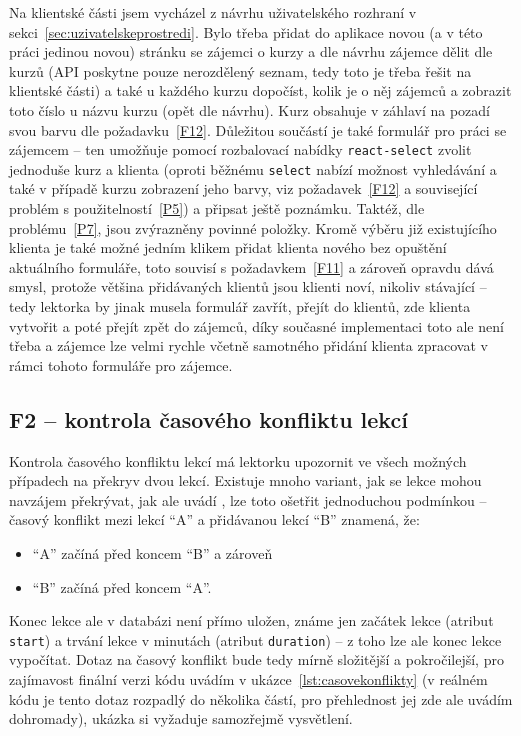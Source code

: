 Na klientské části jsem vycházel z návrhu uživatelského rozhraní v sekci~\ref{sec:uzivatelskeprostredi}. Bylo třeba přidat do aplikace novou (a v této práci jedinou novou) stránku se zájemci o kurzy a dle návrhu zájemce dělit dle kurzů (API poskytne pouze nerozdělený seznam, tedy toto je třeba řešit na klientské části) a také u každého kurzu dopočíst, kolik je o něj zájemců a zobrazit toto číslo u názvu kurzu (opět dle návrhu). Kurz obsahuje v záhlaví na pozadí svou barvu dle požadavku~\ref{F12}. Důležitou součástí je také formulář pro práci se zájemcem -- ten umožňuje pomocí rozbalovací nabídky \verb|react-select| zvolit jednoduše kurz a klienta (oproti běžnému \verb|select| nabízí možnost vyhledávání a také v případě kurzu zobrazení jeho barvy, viz požadavek~\ref{F12} a související problém s použitelností~\ref{P5}) a připsat ještě poznámku. Taktéž, dle problému~\ref{P7}, jsou zvýrazněny povinné položky. Kromě výběru již existujícího klienta je také možné jedním klikem přidat klienta nového bez opuštění aktuálního formuláře, toto souvisí s požadavkem~\ref{F11} a zároveň opravdu dává smysl, protože většina přidávaných klientů jsou klienti noví, nikoliv stávající -- tedy lektorka by jinak musela formulář zavřít, přejít do klientů, zde klienta vytvořit a poté přejít zpět do zájemců, díky současné implementaci toto ale není třeba a zájemce lze velmi rychle včetně samotného přidání klienta zpracovat v rámci tohoto formuláře pro zájemce.

\subsection{F2 -- kontrola časového konfliktu lekcí}

Kontrola časového konfliktu lekcí má lektorku upozornit ve všech možných případech na překryv dvou lekcí. Existuje mnoho variant, jak se lekce mohou navzájem překrývat, jak ale uvádí \cite{overlap}, lze toto ošetřit jednoduchou podmínkou -- časový konflikt mezi lekcí \enquote{A} a přidávanou lekcí \enquote{B} znamená, že:
\begin{itemize}
    \item \enquote{A} začíná před koncem \enquote{B} a zároveň
    \item \enquote{B} začíná před koncem \enquote{A}.
\end{itemize}

Konec lekce ale v databázi není přímo uložen, známe jen začátek lekce (atribut \verb|start|) a trvání lekce v minutách (atribut \verb|duration|) -- z toho lze ale konec lekce vypočítat. Dotaz na časový konflikt bude tedy mírně složitější a pokročilejší, pro zajímavost finální verzi kódu uvádím v ukázce~\ref{lst:casovekonflikty} (v reálném kódu je tento dotaz rozpadlý do několika částí, pro přehlednost jej zde ale uvádím dohromady), ukázka si vyžaduje samozřejmě vysvětlení.

